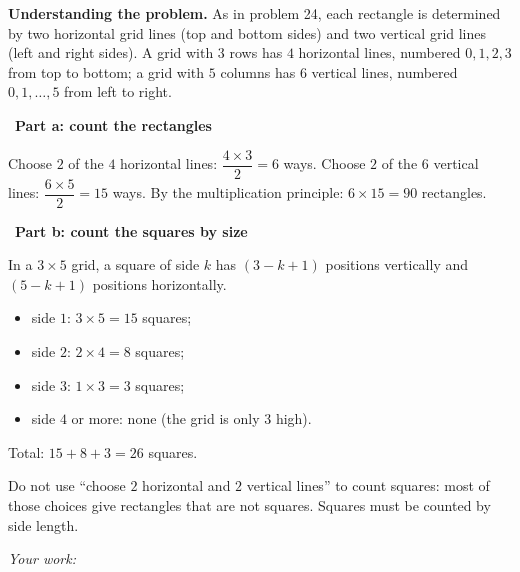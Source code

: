 \documentclass[11pt]{article}
\newif\ifsol \solfalse
\newcommand{\StuProb}[2]{\begin{probboxS}{#1}{#2}\StuProbBody\end{probboxS}}
\newcommand{\probsol}[1]{%
  \begin{lrbox}{\solmeasure}\begin{minipage}{\dimexpr\linewidth-24pt\relax}#1\end{minipage}\end{lrbox}%
  \ifsol
    \begin{solbox}#1\end{solbox}%
  \else
    \setlength{\solht}{\dimexpr\ht\solmeasure+\dp\solmeasure+0.85cm\relax}%
    \ifdim\solht<1.35cm\setlength{\solht}{1.35cm}\fi
    \ifdim\solht>\StudentMaxWork\setlength{\solht}{\StudentMaxWork}\fi
    \par\noindent\begin{minipage}{\linewidth}%
    \expandafter\StuProb\StuProbArgs
    \begin{tcolorbox}[colback=white,colframe=Line,boxrule=0.8pt,arc=5pt,
      left=8pt,right=8pt,top=4pt,bottom=4pt,height=\solht]{\footnotesize\color{Slate}\itshape\WorkWord}\end{tcolorbox}%
    \end{minipage}\par\medskip
  \fi}
\newlength{\StudentMaxWork}\setlength{\StudentMaxWork}{4.5cm}
\newcommand{\step}[2]{\par\smallskip\noindent{\bfseries\color{tmBlue!85!black}\StepWord~#1.}\ {\bfseries #2}\par\nopagebreak}
\def\WorkWord{Your work:}
\def\StepWord{Step}
\begin{document}
\probsol{
\textbf{Understanding the problem.} As in problem 24, each rectangle is determined by two horizontal grid lines (top and bottom sides) and
two vertical grid lines (left and right sides). A grid with $3$ rows has $4$ horizontal lines, numbered $0,1,2,3$ from top to bottom; a grid
with $5$ columns has $6$ vertical lines, numbered $0,1,\dots,5$ from left to right.

\step{1}{Part a: count the rectangles}
Choose $2$ of the $4$ horizontal lines: $\dfrac{4\times3}{2}=6$ ways. Choose $2$ of the $6$ vertical lines: $\dfrac{6\times5}{2}=15$ ways.
By the multiplication principle: $6\times15=90$ rectangles.

\step{2}{Part b: count the squares by size}
\begin{recallbox}In a $3\times5$ grid, a square of side $k$ has $(3-k+1)$ positions vertically and $(5-k+1)$ positions horizontally.\end{recallbox}
\begin{itemize}[leftmargin=1.2em,itemsep=1pt,topsep=2pt]
\item side $1$: $3\times5=15$ squares;
\item side $2$: $2\times4=8$ squares;
\item side $3$: $1\times3=3$ squares;
\item side $4$ or more: none (the grid is only $3$ high).
\end{itemize}
Total: $15+8+3=26$ squares.
\begin{warnbox}Do not use ``choose $2$ horizontal and $2$ vertical lines'' to count squares: most of those choices give rectangles that are not
squares. Squares must be counted by side length.\end{warnbox}

}
\end{document}

